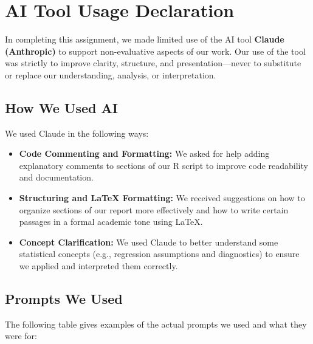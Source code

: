 \chapter*{AI Tool Usage Declaration}

In completing this assignment, we made limited use of the AI tool \textbf{Claude (Anthropic)} to support non-evaluative aspects of our work. Our use of the tool was strictly to improve clarity, structure, and presentation—never to substitute or replace our understanding, analysis, or interpretation.

\section*{How We Used AI}
We used Claude in the following ways:
\begin{itemize}
	\item \textbf{Code Commenting and Formatting:} We asked for help adding explanatory comments to sections of our R script to improve code readability and documentation.
	\item \textbf{Structuring and LaTeX Formatting:} We received suggestions on how to organize sections of our report more effectively and how to write certain passages in a formal academic tone using LaTeX.
	\item \textbf{Concept Clarification:} We used Claude to better understand some statistical concepts (e.g., regression assumptions and diagnostics) to ensure we applied and interpreted them correctly.
\end{itemize}

\section*{Prompts We Used}
The following table gives examples of the actual prompts we used and what they were for:

